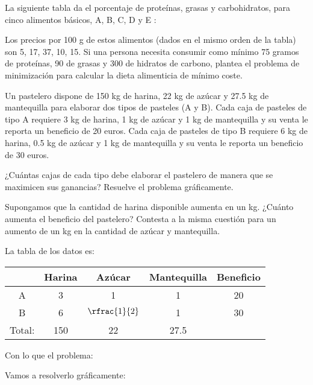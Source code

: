 \begin{problem}[3]

La siguiente tabla da el porcentaje de proteínas, grasas y carbohidratos, para cinco alimentos
básicos, A, B, C, D y E :


Los precios por 100 g de estos alimentos (dados en el mismo orden de la tabla) son 5, 17, 37, 10,
15. Si una persona necesita consumir como mínimo 75 gramos de proteínas, 90 de grasas y 300 de
hidratos de carbono, plantea el problema de minimización para calcular la dieta alimenticia de mínimo coste.
\solution


\end{problem}


\begin{problem}[5]

Un pastelero dispone de 150 kg de harina, 22 kg de azúcar y 27.5 kg de mantequilla para elaborar
dos tipos de pasteles (A y B). Cada caja de pasteles de tipo A requiere 3 kg de harina, 1 kg de azúcar
y 1 kg de mantequilla y su venta le reporta un beneficio de 20 euros. Cada caja de pasteles de tipo
B requiere 6 kg de harina, 0.5 kg de azúcar y 1 kg de mantequilla y su venta le reporta un beneficio
de 30 euros.

\ppart ¿Cuántas cajas de cada tipo debe elaborar el pastelero de manera que se maximicen sus
ganancias? Resuelve el problema gráficamente.

\ppart Supongamos que la cantidad de harina disponible aumenta en un kg. ¿Cuánto aumenta
el beneficio del pastelero? Contesta a la misma cuestión para un aumento de un kg en la
cantidad de azúcar y mantequilla.

\solution

La tabla de los datos es:
\begin{table}[hbtp]
\centering
\begin{tabular}{ccccc}
&Harina&Azúcar&Mantequilla&Beneficio\\\hline
A&3&1&1&20\\
B&6&$\rfrac{1}{2}$&1&30\\\hline
Total:&150&22&27.5&
\end{tabular}
\end{table}

Con lo que el problema:

\begin{ioprob}
\end{ioprob}

Vamos a resolverlo gráficamente:


\end{problem}
